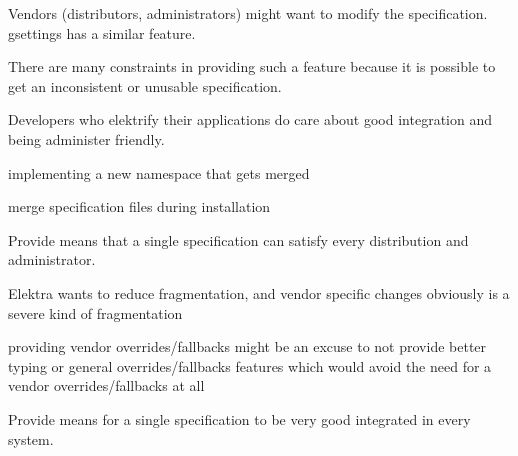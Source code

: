 Vendors (distributors, administrators) might want to modify the specification. gsettings has a similar feature.

There are many constraints in providing such a feature because it is possible to get an inconsistent or unusable specification.

Developers who elektrify their applications do care about good integration and being administer friendly.


\begin{DoxyItemize}
\item implementing a new namespace that gets merged
\item merge specification files during installation
\end{DoxyItemize}

Provide means that a single specification can satisfy every distribution and administrator.


\begin{DoxyItemize}
\item Elektra wants to reduce fragmentation, and vendor specific changes obviously is a severe kind of fragmentation
\item providing vendor overrides/fallbacks might be an excuse to not provide better typing or general overrides/fallbacks features which would avoid the need for a vendor overrides/fallbacks at all
\end{DoxyItemize}

Provide means for a single specification to be very good integrated in every system.